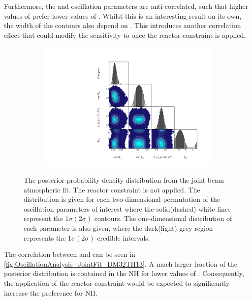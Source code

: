 Furthermore, the  and  oscillation parameters are anti-correlated, such that higher values of  prefer lower values of . Whilst this is an interesting result on its own, the width of the  contours also depend on . This introduces another correlation effect that could modify the sensitivity to  once the reactor constraint is applied.

\begin{figure}[h]
  \begin{subfigure}[t]{\textwidth}
    \includegraphics[width=\textwidth, trim={0mm 0mm 0mm 0mm}, clip,page=1]{Figures/OA/JointFit/Contours_1D_woRC_UnSmeared_CredibleInterval_TrianglePlot.pdf}
  \end{subfigure}
  \caption{The posterior probability density distribution from the joint beam-atmospheric fit. The reactor constraint is not applied. The distribution is given for each two-dimensional permutation of the oscillation parameters of interest where the solid(dashed) white lines represent the $1\sigma(2\sigma)$ contours. The one-dimensional distribution of each parameter is also given, where the dark(light) grey region represents the $1\sigma(2\sigma)$ credible intervals.}
  \label{fig:OscillationAnalysis_JointFit_TriPlot}
\end{figure}

The correlation between  and  can be seen in \autoref{fig:OscillationAnalysis_JointFit_DM32TH13}. A much larger fraction of the posterior distribution is contained in the NH for lower values of . Consequently, the application of the reactor constraint would be expected to significantly increase the preference for NH.

